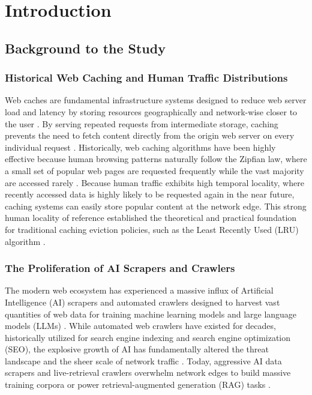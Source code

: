 \chapter{Introduction}
\label{chap:introduction}

\section{Background to the Study}

\subsection{Historical Web Caching and Human Traffic Distributions}
Web caches are fundamental infrastructure systems designed to reduce web server load and latency by storing resources geographically and network-wise closer to the user \cite{breslau_web_1999}. By serving repeated requests from intermediate storage, caching prevents the need to fetch content directly from the origin web server on every individual request \cite{breslau_web_1999, umar_experimental_2026}. Historically, web caching algorithms have been highly effective because human browsing patterns naturally follow the Zipfian law, where a small set of popular web pages are requested frequently while the vast majority are accessed rarely \cite{breslau_web_1999}. Because human traffic exhibits high temporal locality, where recently accessed data is highly likely to be requested again in the near future, caching systems can easily store popular content at the network edge. This strong human locality of reference established the theoretical and practical foundation for traditional caching eviction policies, such as the Least Recently Used (LRU) algorithm \cite{breslau_web_1999}.

\subsection{The Proliferation of AI Scrapers and Crawlers}
The modern web ecosystem has experienced a massive influx of Artificial Intelligence (AI) scrapers and automated crawlers designed to harvest vast quantities of web data for training machine learning models and large language models (LLMs) \cite{kim_scrapers_2025, zhang_rethinking_2026}. While automated web crawlers have existed for decades, historically utilized for search engine indexing and search engine optimization (SEO), the explosive growth of AI has fundamentally altered the threat landscape and the sheer scale of network traffic \cite{kim_scrapers_2025}. Today, aggressive AI data scrapers and live-retrieval crawlers overwhelm network edges to build massive training corpora or power retrieval-augmented generation (RAG) tasks \cite{zhang_rethinking_2026}.

